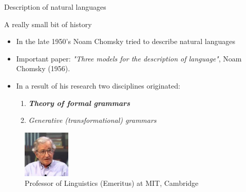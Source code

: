 \documentclass{beamer}
\begin{document}
\begin{frame}{Description of natural languages}

\begin{block}{A really small bit of history}
\begin{itemize}
\item In the late 1950's Noam Chomsky tried to describe natural languages
\item Important paper:  \textit{"Three models for the description of language"}, Noam Chomsky (1956).
\item In a result of his research two disciplines originated:
\begin{enumerate}
\item \textbf{\textit{Theory of formal grammars}}
\item \textit{Generative (transformational) grammars}
\end{enumerate}
\end{itemize}
\end{block}

\begin{figure}
\includegraphics[width=0.2\textwidth]{img/noam_2.jpg}
\caption{\label{fig:your-figure}Professor of Linguistics (Emeritus) at MIT, Cambridge}
\end{figure}

\end{frame}
\end{document}
